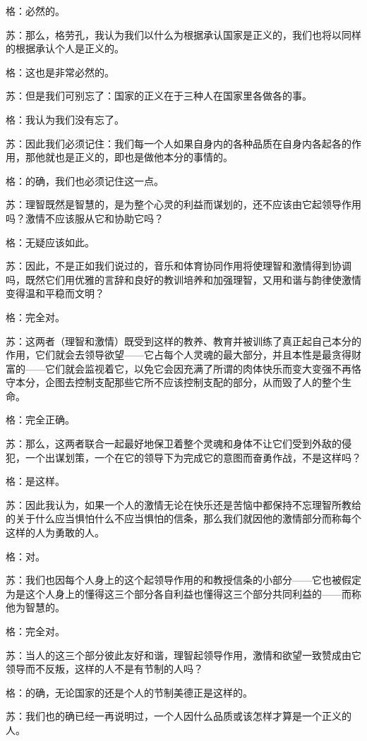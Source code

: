\documentclass[12pt,oneside]{book}
\begin{document}
格：必然的。

苏：那么，格劳孔，我认为我们以什么为根据承认国家是正义的，我们也将以同样的根据承认个人是正义的。

格：这也是非常必然的。

苏：但是我们可别忘了：国家的正义在于三种人在国家里各做各的事。

格：我认为我们没有忘了。

苏：因此我们必须记住：我们每一个人如果自身内的各种品质在自身内各起各的作用，那他就也是正义的，即也是做他本分的事情的。

格：的确，我们也必须记住这一点。

苏：理智既然是智慧的，是为整个心灵的利益而谋划的，还不应该由它起领导作用吗？激情不应该服从它和协助它吗？

格：无疑应该如此。

苏：因此，不是正如我们说过的，音乐和体育协同作用将使理智和激情得到协调吗，既然它们用优雅的言辞和良好的教训培养和加强理智，又用和谐与韵律使激情变得温和平稳而文明？

格：完全对。

苏：这两者（理智和激情）既受到这样的教养、教育并被训练了真正起自己本分的作用，它们就会去领导欲望——它占每个人灵魂的最大部分，并且本性是最贪得财富的——它们就会监视着它，以免它会因充满了所谓的肉体快乐而变大变强不再恪守本分，企图去控制支配那些它所不应该控制支配的部分，从而毁了人的整个生命。

格：完全正确。

苏：那么，这两者联合一起最好地保卫着整个灵魂和身体不让它们受到外敌的侵犯，一个出谋划策，一个在它的领导下为完成它的意图而奋勇作战，不是这样吗？

格：是这样。

苏：因此我认为，如果一个人的激情无论在快乐还是苦恼中都保持不忘理智所教给的关于什么应当惧怕什么不应当惧怕的信条，那么我们就因他的激情部分而称每个这样的人为勇敢的人。

格：对。

苏：我们也因每个人身上的这个起领导作用的和教授信条的小部分——它也被假定为是这个人身上的懂得这三个部分各自利益也懂得这三个部分共同利益的——而称他为智慧的。

格：完全对。

苏：当人的这三个部分彼此友好和谐，理智起领导作用，激情和欲望一致赞成由它领导而不反叛，这样的人不是有节制的人吗？

格：的确，无论国家的还是个人的节制美德正是这样的。

苏：我们也的确已经一再说明过，一个人因什么品质或该怎样才算是一个正义的人。
\end{document}
